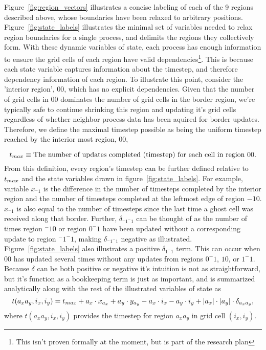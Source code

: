 Figure~\ref{fig:region_vectors} illustrates a concise labeling of
each of the 9 regions described above, whose boundaries have been relaxed to arbitrary positions.
  Figure~\ref{fig:state_labels} illustrates the minimal set of variables needed to relax region boundaries
for a single process, and delimits the regions they collectively form.
With these dynamic variables of state, each process has enough information
to ensure the grid cells
of each region have valid dependencies\footnote{
  This isn't proven formally at the moment, but is part of the research plan
}.
This is because each state variable captures information about the timestep,
and therefore dependency information of each region.  To illustrate this point,
consider the 'interior region', $00$, which
has no explicit dependencies.  Given that the number of grid cells in $00$
dominates the number of grid cells in the border region, we're
typically safe to continue shrinking this region
and updating it's grid cells regardless of whether neighbor
process data has been aquired for border updates.
Therefore, we define the maximal timestep possible as being
the uniform timestep reached by the interior most
region, $00$,

\begin{equation}
  \text{$t_{max}$} \equiv \text{The number of updates completed (timestep) for each cell in region $00$}.
\end{equation}
From this definition, every region's timestep can be further defined relative to $\text{$t_{max}$}$ and the state
variables drawn in figure~\ref{fig:state_labels}.  For example, variable $x_{^-1}$ is the difference in the
 number of timesteps completed by the interior region and the number of timesteps completed at the leftmost edge
 of region $-10$.  $x_{^-1}$ is also equal to the number of timesteps since the last time a ghost cell was received along
 that border.  Further, $\delta_{^-1^-1}$ can be thought of as the number of times
region $^-10$ or region $0^-1$ have been updated without a corresponding update to region $^-1^-1$, making $\delta_{^-1^-1}$
negative as illustrated.  Figure~\ref{fig:state_labels} also illustrates a positive
 $\delta_{1^-1}$ term.  This can occur when $00$ has updated several times without
any updates from regions $0^-1$, $10$, or $1^-1$.  Because $\delta$ can be both positive or negative
it's intuition is not as straightforward, but it's function as a bookkeeping term is just as important, and
is summarized analytically along with the rest of the illustrated variables of state as
\begin{equation}
  t(a_xa_y,i_x,i_y) = \text{$t_{max}$} +
  a_x \cdot x_{a_x} + a_y \cdot y_{a_y} -
  a_x \cdot i_x - a_y \cdot i_y +
  |a_x|\cdot|a_y|\cdot\delta_{a_xa_y},
  \label{eq:ts}
\end{equation}
where $t(a_xa_y,i_x,i_y)$ provides the timestep for region $a_xa_y$ in grid cell $(i_x,i_y)$.

